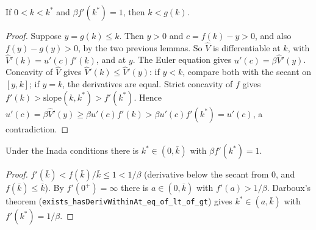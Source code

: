 \begin{lemma}
\label{lem:rck_lt_policy}
\leanok
{}
If $0 < k < k^*$ and $\beta f'(k^*) = 1$, then $k < g(k)$.
\end{lemma}
\begin{proof}
\leanok
Suppose $y = g(k) \le k$. Then $y > 0$ and $c = f(k) - y > 0$, and also $f(y) - g(y) > 0$, by the two previous lemmas.
So $\hat V$ is differentiable at $k$, with $\hat V'(k) = u'(c) f'(k)$, and at $y$. The Euler equation gives
$u'(c) = \beta \hat V'(y)$. Concavity of $\hat V$ gives $\hat V'(k) \le \hat V'(y)$: if $y < k$, compare both with
the secant on $[y,k]$; if $y = k$, the derivatives are equal. Strict concavity of $f$ gives
$f'(k) > \text{slope}(k,k^*) > f'(k^*)$. Hence
$u'(c) = \beta \hat V'(y) \ge \beta u'(c) f'(k) > \beta u'(c) f'(k^*) = u'(c)$, a contradiction.
\end{proof}

\begin{lemma}
\label{lem:rck_exists_mgr}
\leanok
{}
Under the Inada conditions there is $k^* \in (0, \bar k)$ with $\beta f'(k^*) = 1$.
\end{lemma}
\begin{proof}
\leanok
$f'(\bar k) < f(\bar k)/\bar k \le 1 < 1/\beta$ (derivative below the secant from $0$, and $f(\bar k) \le \bar k$).
By $f'(0^+) = \infty$ there is $a \in (0, \bar k)$ with $f'(a) > 1/\beta$. Darboux's theorem
(\texttt{exists\_hasDerivWithinAt\_eq\_of\_lt\_of\_gt}) gives $k^* \in (a, \bar k)$ with $f'(k^*) = 1/\beta$.
\end{proof}


